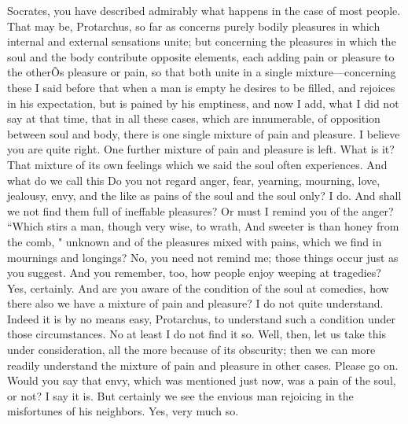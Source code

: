 \documentclass[letterpaper,12pt]{article}
\newcommand{\stephpag}[1]{\marginnote{\small\itshape\fontfamily{ppl}\selectfont #1}}
\begin{document}
\begin{drama}
\protarchusspeaks
Socrates, you have described admirably what happens \stephpag{c} in the case of most people.
\socratesspeaks
That may be, Protarchus, so far as concerns purely bodily pleasures in which internal and external sensations unite; but concerning the pleasures in which the soul and the body contribute opposite elements, each adding pain or pleasure to the otherÕs pleasure or pain, so that both unite in a single mixture---concerning these I said before that when a man is empty he desires to be filled, and rejoices in his expectation, but is pained by his emptiness, and now I add, what I did not say at that time, that in all these cases, which are innumerable, \stephpag{d} of opposition between soul and body, there is one single mixture of pain and pleasure.
\protarchusspeaks
I believe you are quite right.
\socratesspeaks
One further mixture of pain and pleasure is left.
\protarchusspeaks
What is it?
\socratesspeaks
That mixture of its own feelings which we said the soul often experiences.
\protarchusspeaks
And what do we call this \stephpag{e}
\socratesspeaks
Do you not regard anger, fear, yearning, mourning, love, jealousy, envy, and the like as pains of the soul and the soul only?
\protarchusspeaks
I do.
\socratesspeaks
And shall we not find them full of ineffable pleasures? Or must I remind you of the anger?
``Which stirs a man, though very wise, to wrath,
And sweeter is than honey from the comb,
"
unknown
\stephpag{48 a} and of the pleasures mixed with pains, which we find in mournings and longings?
\protarchusspeaks
No, you need not remind me; those things occur just as you suggest.
\socratesspeaks
And you remember, too, how people enjoy weeping at tragedies?
\protarchusspeaks
Yes, certainly.
\socratesspeaks
And are you aware of the condition of the soul at comedies, how there also we have a mixture of pain and pleasure?
\protarchusspeaks
I do not quite understand. \stephpag{b}
\socratesspeaks
Indeed it is by no means easy, Protarchus, to understand such a condition under those circumstances.
\protarchusspeaks
No at least I do not find it so.
\socratesspeaks
Well, then, let us take this under consideration, all the more because of its obscurity; then we can more readily understand the mixture of pain and pleasure in other cases.
\protarchusspeaks
Please go on.
\socratesspeaks
Would you say that envy, which was mentioned just now, was a pain of the soul, or not?
\protarchusspeaks
I say it is.
\socratesspeaks
But certainly we see the envious man rejoicing in the misfortunes of his neighbors. \stephpag{c}
\protarchusspeaks
Yes, very much so.

\end{drama}
\end{document}
